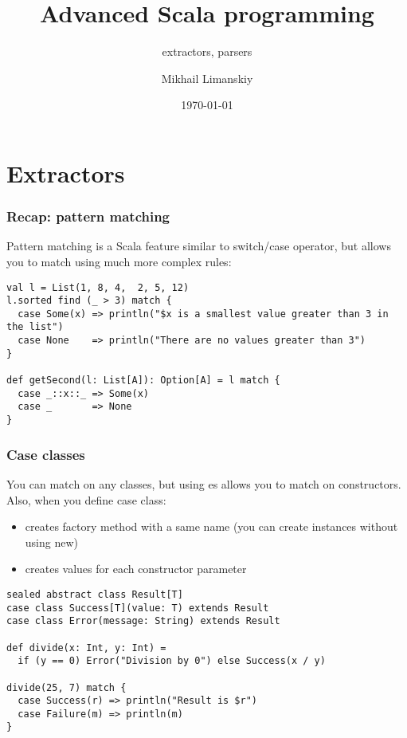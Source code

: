 \documentclass[t]{beamer}
\title{Advanced Scala programming}
\subtitle{extractors, parsers}
\author{Mikhail Limanskiy}
\institute{SymphonyTeleca}
\date{\today}
\begin{document}
\begin{frame}
    \titlepage
\end{frame}

\section{Extractors}

\begin{frame}[fragile]
\frametitle{Recap: pattern matching}
Pattern matching is a Scala feature similar to switch/case operator, but allows you to match
using much more complex rules:
\begin{example}
\begin{lstlisting}
val l = List(1, 8, 4,  2, 5, 12)
l.sorted find (_ > 3) match {
  case Some(x) => println("$x is a smallest value greater than 3 in the list")
  case None    => println("There are no values greater than 3")
}

def getSecond(l: List[A]): Option[A] = l match {
  case _::x::_ => Some(x)
  case _       => None
}
\end{lstlisting}
\end{example}
\end{frame}

\begin{frame}[fragile]
\frametitle{Case classes}
You can match on any classes, but using es allows you to match on constructors.
Also, when you define case class:
\begin{itemize}
\item creates factory method with a same name (you can create instances without using new)
\item creates values for each constructor parameter
\end{itemize}
\begin{example}
\begin{lstlisting}
sealed abstract class Result[T]
case class Success[T](value: T) extends Result
case class Error(message: String) extends Result

def divide(x: Int, y: Int) =
  if (y == 0) Error("Division by 0") else Success(x / y)

divide(25, 7) match {
  case Success(r) => println("Result is $r")
  case Failure(m) => println(m)
}
\end{lstlisting}
\end{example}
\end{frame}
\end{document}
